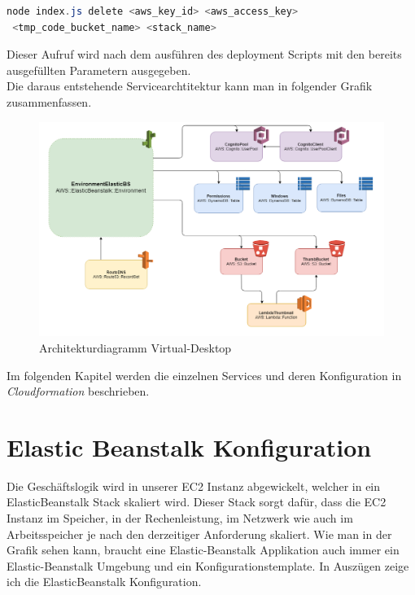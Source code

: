 \documentclass[a4paper, 12pt]{scrreprt}
\renewcommand\_{\textunderscore\allowbreak}
\begin{document}
\begin{lstlisting}[xleftmargin=\parindent,frame=L,mathescape=true, basicstyle=\small, language=Java, lineskip={1.0pt}]
node index.js delete <aws_key_id> <aws_access_key>
 <tmp_code_bucket_name> <stack_name>
\end{lstlisting}

Dieser Aufruf wird nach dem ausführen des deployment Scripts mit den bereits ausgefüllten Parametern ausgegeben. \\
Die daraus entstehende Servicearchtitektur kann man in folgender Grafik zusammenfassen.

\begin{figure}[h!]
\centering
\includegraphics[scale=0.45]{ArchiDiagram.png} 
\caption{Architekturdiagramm Virtual-Desktop}
\end{figure}

Im folgenden Kapitel werden die einzelnen Services und deren Konfiguration in \textit{Cloudformation} beschrieben. 

\newpage
\section{Elastic Beanstalk Konfiguration}
Die Geschäftslogik wird in unserer EC2 Instanz abgewickelt, welcher in ein ElasticBeanstalk Stack skaliert wird. Dieser Stack sorgt dafür, dass die EC2 Instanz im Speicher, in der Rechenleistung, im Netzwerk wie auch im Arbeitsspeicher je nach den derzeitiger Anforderung skaliert. Wie man in der Grafik sehen kann, braucht eine Elastic-Beanstalk Applikation auch immer ein Elastic-Beanstalk Umgebung und ein Konfigurationstemplate. In Auszügen zeige ich die ElasticBeanstalk Konfiguration.
\end{document}
